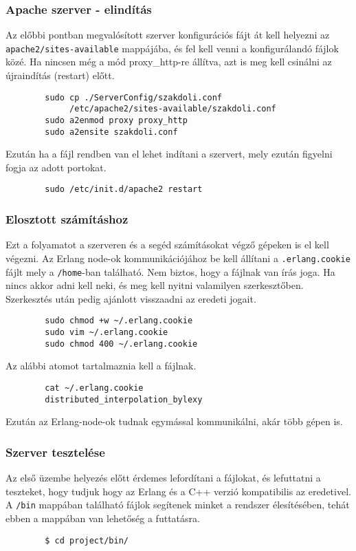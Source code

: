 \subsubsection{Apache szerver - elindítás}
	Az előbbi pontban megvalósított szerver konfigurációs fájt át kell helyezni az \\ \texttt{apache2/sites-available} mappájába, és fel kell venni a konfigurálandó fájlok közé. Ha nincsen még a mód proxy\_http-re állítva, azt is meg kell csinálni az újraindítás (restart) előtt. 
	\begin{verbatim}
		sudo cp ./ServerConfig/szakdoli.conf 
		     /etc/apache2/sites-available/szakdoli.conf
		sudo a2enmod proxy proxy_http
		sudo a2ensite szakdoli.conf
	\end{verbatim}
	Ezután ha a fájl rendben van el lehet indítani a szervert, mely ezután figyelni fogja az adott portokat.
	\begin{verbatim}
		sudo /etc/init.d/apache2 restart
	\end{verbatim}

\subsubsection{Elosztott számításhoz}
	Ezt a folyamatot a szerveren és a segéd számításokat végző gépeken is el kell végezni. \newline
	Az Erlang node-ok kommunikációjához be kell állítani a \texttt{.erlang.cookie} fájlt mely a \texttt{/home}-ban található. 
	Nem biztos, hogy a fájlnak van írás joga. Ha nincs akkor adni kell neki, és meg kell nyitni valamilyen szerkesztőben.
	Szerkesztés után pedig ajánlott visszaadni az eredeti jogait.
	\begin{verbatim}
		sudo chmod +w ~/.erlang.cookie
		sudo vim ~/.erlang.cookie
		sudo chmod 400 ~/.erlang.cookie
	\end{verbatim}
	Az alábbi atomot tartalmaznia kell a fájlnak.
	\begin{verbatim}
		cat ~/.erlang.cookie
		distributed_interpolation_bylexy
	\end{verbatim}
	Ezután az Erlang-node-ok tudnak egymással kommunikálni, akár több gépen is.

\subsubsection{Szerver tesztelése}
	Az első üzembe helyezés előtt érdemes lefordítani a fájlokat, és lefuttatni a teszteket, hogy tudjuk hogy az Erlang és a C++ verzió kompatibilis az eredetivel. \newline
	A \texttt{/bin} mappában található fájlok segítenek minket a rendszer élesítésében, tehát ebben a mappában van lehetőség a futtatásra.  
	\begin{verbatim}
		$ cd project/bin/
	\end{verbatim}

